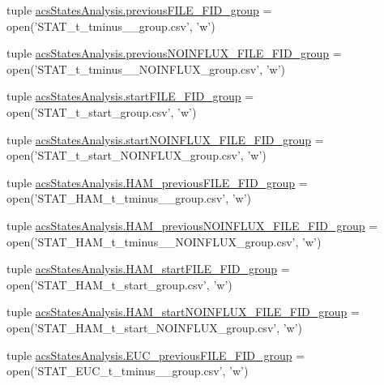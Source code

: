 \begin{DoxyCompactItemize}
\item 
tuple \hyperlink{a00098_a9e72c152be1f5aac24af10b353b16390}{acs\-States\-Analysis.\-previous\-F\-I\-L\-E\-\_\-\-F\-I\-D\-\_\-group} = open('S\-T\-A\-T\-\_\-t\-\_\-tminus\-\_\-\_\-group.\-csv', 'w')
\item 
tuple \hyperlink{a00098_a648b56a19ba8992cdb56d307ed22eb41}{acs\-States\-Analysis.\-previous\-N\-O\-I\-N\-F\-L\-U\-X\-\_\-\-F\-I\-L\-E\-\_\-\-F\-I\-D\-\_\-group} = open('S\-T\-A\-T\-\_\-t\-\_\-tminus\-\_\-\_\-\-N\-O\-I\-N\-F\-L\-U\-X\-\_\-group.\-csv', 'w')
\item 
tuple \hyperlink{a00098_addede16e21598cc53c446efa66bd20d9}{acs\-States\-Analysis.\-start\-F\-I\-L\-E\-\_\-\-F\-I\-D\-\_\-group} = open('S\-T\-A\-T\-\_\-t\-\_\-start\-\_\-group.\-csv', 'w')
\item 
tuple \hyperlink{a00098_a14eebfeaac72a017ee76d69b55033042}{acs\-States\-Analysis.\-start\-N\-O\-I\-N\-F\-L\-U\-X\-\_\-\-F\-I\-L\-E\-\_\-\-F\-I\-D\-\_\-group} = open('S\-T\-A\-T\-\_\-t\-\_\-start\-\_\-\-N\-O\-I\-N\-F\-L\-U\-X\-\_\-group.\-csv', 'w')
\item 
tuple \hyperlink{a00098_aa72272e636b1eafe39ed3367145433f2}{acs\-States\-Analysis.\-H\-A\-M\-\_\-previous\-F\-I\-L\-E\-\_\-\-F\-I\-D\-\_\-group} = open('S\-T\-A\-T\-\_\-\-H\-A\-M\-\_\-t\-\_\-tminus\-\_\-\_\-group.\-csv', 'w')
\item 
tuple \hyperlink{a00098_a092676cc95ddff57aac2aa077ce22d52}{acs\-States\-Analysis.\-H\-A\-M\-\_\-previous\-N\-O\-I\-N\-F\-L\-U\-X\-\_\-\-F\-I\-L\-E\-\_\-\-F\-I\-D\-\_\-group} = open('S\-T\-A\-T\-\_\-\-H\-A\-M\-\_\-t\-\_\-tminus\-\_\-\_\-\-N\-O\-I\-N\-F\-L\-U\-X\-\_\-group.\-csv', 'w')
\item 
tuple \hyperlink{a00098_ab74ecb2bab6a84c44274814862f2e96c}{acs\-States\-Analysis.\-H\-A\-M\-\_\-start\-F\-I\-L\-E\-\_\-\-F\-I\-D\-\_\-group} = open('S\-T\-A\-T\-\_\-\-H\-A\-M\-\_\-t\-\_\-start\-\_\-group.\-csv', 'w')
\item 
tuple \hyperlink{a00098_a4652c6dad393663e40970d7f6422c1d6}{acs\-States\-Analysis.\-H\-A\-M\-\_\-start\-N\-O\-I\-N\-F\-L\-U\-X\-\_\-\-F\-I\-L\-E\-\_\-\-F\-I\-D\-\_\-group} = open('S\-T\-A\-T\-\_\-\-H\-A\-M\-\_\-t\-\_\-start\-\_\-\-N\-O\-I\-N\-F\-L\-U\-X\-\_\-group.\-csv', 'w')
\item 
tuple \hyperlink{a00098_adf079c2d443f89f00a330a58f99c2095}{acs\-States\-Analysis.\-E\-U\-C\-\_\-previous\-F\-I\-L\-E\-\_\-\-F\-I\-D\-\_\-group} = open('S\-T\-A\-T\-\_\-\-E\-U\-C\-\_\-t\-\_\-tminus\-\_\-\_\-group.\-csv', 'w')
\item 

\end{DoxyCompactItemize}
